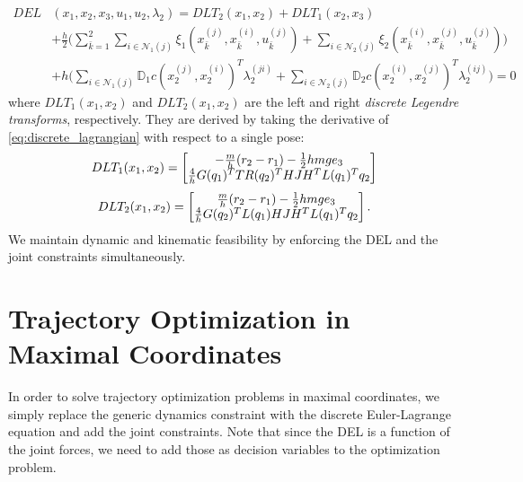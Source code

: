 \documentclass[../root.tex]{subfiles}
\begin{document}
\begin{equation} \label{eq:DEL_single}
\begin{aligned}
    DEL&(x_1, x_2, x_3, u_1, u_2, \lambda_2) = 
    DLT_2(x_1, x_2) + DLT_1(x_2, x_3) \\
    &+ \frac{h}{2} \Bigg( \sum_{\bar{k} = 1}^{2} 
        \sum_{i \in \mathcal{N}_1(j)} \xi_1\left(x_{\bar{k}}^{(j)}, x_{\bar{k}}^{(i)}, u_{\bar{k}}^{(j)}\right) 
      + \sum_{i \in \mathcal{N}_2(j)} \xi_2\left(x_{\bar{k}}^{(i)}, x_{\bar{k}}^{(j)}, u_{\bar{k}}^{(j)}\right)
    \Bigg) \\
    & + h \bigg( \sum_{i \in \mathcal{N}_1(j)} \mathbb{D}_1 c\left(x_2^{(j)}, x_2^{(i)}\right)^T \lambda_2^{(ji)} 
      +         \sum_{i \in \mathcal{N}_2(j)} \mathbb{D}_2 c\left(x_2^{(i)}, x_2^{(j)}\right)^T \lambda_2^{(ij)} \bigg) = 0
\end{aligned}
\end{equation}
where $DLT_1(x_1, x_2)$ and $DLT_2(x_1, x_2)$ are the left and right 
\textit{discrete Legendre transforms}, respectively. They are derived by taking the 
derivative of \eqref{eq:discrete_lagrangian} with respect to a single pose:
\begin{equation}
    DLT_1(x_1, x_2) = \begin{bmatrix}
        -\frac{m}{h} (r_2 - r_1) - \frac{1}{2} h m g e_3 \\
        \frac{4}{h} G(q_1)^T T R(q_2)^T H J H^T L(q_1)^T q_2
    \end{bmatrix}
\end{equation}
\begin{equation}
    DLT_2(x_1, x_2) = \begin{bmatrix}
        \frac{m}{h} (r_2 - r_1) - \frac{1}{2} h m g e_3 \\
        \frac{4}{h} G(q_2)^T L(q_1) H J H^T L(q_1)^T q_2
    \end{bmatrix}.
\end{equation}
We maintain dynamic and kinematic feasibility by enforcing the DEL and the joint constraints 
simultaneously. 

\section{Trajectory Optimization in Maximal Coordinates}
In order to solve trajectory optimization problems in maximal coordinates, we simply 
replace the generic dynamics constraint with the discrete 
Euler-Lagrange equation and add the joint constraints. Note that since the DEL is a function
of the joint forces, we need to add those as decision variables to the optimization problem.
\end{document}
